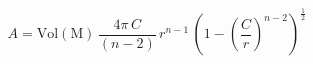 \begin{equation}
A=\mathrm{Vol(M)} \,\frac{4\pi \,C}{(n-2)}\,
r^{n-1}\,\left(1-\left(\frac{C}{r}\right)^{n-2}\right)^{\frac{1}{2}}
\end{equation}

